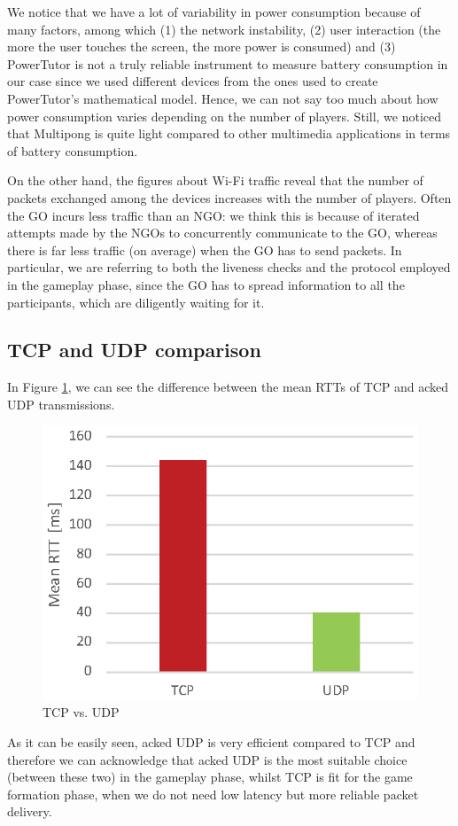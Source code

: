 We notice that we have a lot of variability in power consumption because of
many factors, among which (1) the network instability, (2) user interaction
(the more the user touches the screen, the more power is consumed) and (3)
PowerTutor is not a truly reliable instrument to measure battery consumption in
our case since we used different devices from the ones used to create
PowerTutor's mathematical model. Hence, we can not say too much about how power
consumption varies depending on the number of players. Still, we noticed that
Multipong is quite light compared to other multimedia applications in terms of
battery consumption.

On the other hand, the figures about Wi-Fi traffic reveal that the number of
packets exchanged among the devices increases with the number of players. Often
the GO incurs less traffic than an NGO: we think this is because of iterated
attempts made by the NGOs to concurrently communicate to the GO, whereas
there is far less traffic (on average) when the GO has to send packets. In
particular, we are referring to both the liveness checks and the protocol
employed in the gameplay phase, since the GO has to spread information to all
the participants, which are diligently waiting for it.

\subsection{TCP and UDP comparison}

In Figure \ref{fig:TCP-UDP}, we can see the difference between the mean RTTs of
TCP and acked UDP transmissions.

\begin{figure}[H]
  \centering
  \includegraphics[width=.8\columnwidth]{img/UDPvsTCP-RTT.eps}
  \caption{TCP vs. UDP}
  \label{fig:TCP-UDP}
\end{figure}

As it can be easily seen, acked UDP is very efficient compared to TCP and
therefore we can acknowledge that acked UDP is the most suitable choice (between
these two) in the gameplay phase, whilst TCP is fit for the game formation
phase, when we do not need low latency but more reliable packet delivery.
